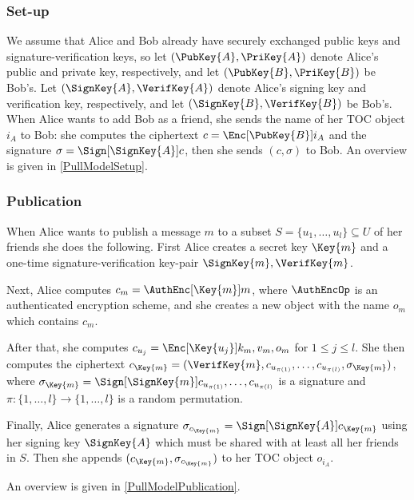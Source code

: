 \subsubsection<article>{Set-up}

We assume that Alice and Bob already have securely exchanged public keys and 
signature-verification keys,
so let \((\PubKey{A}, \PriKey{A})\) denote Alice's public and private key, 
respectively, and let \((\PubKey{B}, \PriKey{B})\) be Bob's.
Let \((\SignKey{A}, \VerifKey{A})\) denote Alice's signing key and verification 
key, respectively, and let \((\SignKey{B}, \VerifKey{B})\) be Bob's.
When Alice wants to add Bob as a friend, she sends the name of her \ac{TOC} 
object \(i_A\) to Bob:
she computes the ciphertext \(c = \Enc[\PubKey{B}]{ i_A }\) and the signature 
\(\sigma = \Sign[\SignKey{A}]{ c }\), then she sends \((c, \sigma)\) to Bob.
An overview is given in \cref{PullModelSetup}.

\subsubsection<article>{Publication}

When Alice wants to publish a message \(m\) to a subset \(S = \{u_1, \ldots, 
  u_l\}\subseteq U\) of her friends she does the following.
First Alice creates a secret key \(\Key{m}\) and a one-time 
signature-verification key-pair \(\SignKey{m}, \VerifKey{m}\).

Next, Alice computes \(c_m = \AuthEnc[\Key{m}]{ m }\), where \(\AuthEncOp\) is 
an authenticated encryption scheme, and she creates a new object with the name 
\(o_m\) which contains \(c_m\).

After that, she computes \(c_{u_j} = \Enc[\Key{u_j}]{ k_m, v_m, o_m }\) for 
\(1\leq j\leq l\).
She then computes the ciphertext \(c_{\Key{m}} = (\VerifKey{m}, c_{u_{\pi(1)}}, 
  \ldots, c_{u_{\pi(l)}}, \sigma_{\Key{m}})\), where \(\sigma_{\Key{m}} 
  = \Sign[\SignKey{m}]{ c_{u_{\pi(1)}}, \ldots, c_{u_{\pi(l)}} }\) is 
a signature and \(\pi\colon \{1,\ldots,l\}\to \{1,\ldots,l\}\) is a random 
permutation.

Finally, Alice generates a signature \(\sigma_{c_{\Key{m}}} 
  = \Sign[\SignKey{A}]{ c_{\Key{m}} }\) using her signing key \(\SignKey{A}\) 
which must be shared with at least all her friends in \(S\).
Then she appends \((c_{\Key{m}}, \sigma_{c_{\Key{m}}})\) to her \ac{TOC} object 
\(o_{i_A}\).

An overview is given in \cref{PullModelPublication}.

